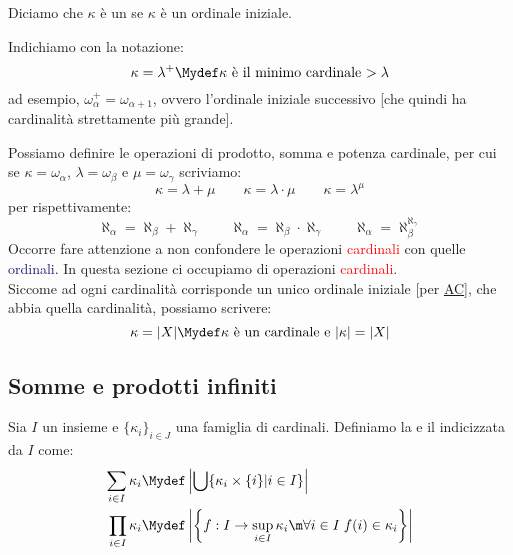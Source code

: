 \documentclass[11pt]{scrartcl}
\begin{document}
\begin{definition}[Cardinali]
	Diciamo che $\kappa$ è un  se $\kappa$ è un ordinale iniziale.
\end{definition}

\begin{notation}
	Indichiamo con la notazione:
	\[ \kappa = \lambda^+ \Mydef \text{$\kappa$ è il minimo cardinale $>\lambda$}
		\]
	ad esempio, $\omega_\alpha^+ = \omega_{\alpha + 1}$, ovvero l'ordinale iniziale successivo [che quindi ha cardinalità strettamente più grande].
\end{notation}

Possiamo definire le operazioni di prodotto, somma e potenza cardinale, per cui se $\kappa = \omega_\alpha$, $\lambda = \omega_\beta$ e $\mu = \omega_\gamma$ scriviamo:
\[ \kappa =  \lambda + \mu \qquad \kappa = \lambda \cdot \mu \qquad \kappa = \lambda^\mu
	\]
per rispettivamente:
\[ \aleph_\alpha = \aleph_\beta + \aleph_\gamma \qquad \aleph_\alpha = \aleph_\beta \cdot \aleph_\gamma \qquad \aleph_\alpha = \aleph_\beta^{\aleph_\gamma}
	\]
Occorre fare attenzione a non confondere le operazioni \textcolor{red}{cardinali} con quelle \textcolor{MidnightBlue}{ordinali}. In questa sezione ci occupiamo di operazioni \textcolor{red}{cardinali}.\\
Siccome ad ogni cardinalità corrisponde un unico ordinale iniziale [per \hyperref[ax9]{AC}], che abbia quella cardinalità, possiamo scrivere:
\[ \kappa = |X| \Mydef \text{$\kappa$ è un cardinale e $|\kappa| = |X|$}
	\]

\subsection{Somme e prodotti infiniti}

\begin{definition}
	Sia $I$ un insieme e $\{\kappa_i\}_{i \in J}$ una famiglia di cardinali. Definiamo la  e il  indicizzata da $I$ come:
	 \begin{align*}
		\sum_{i \in I} \kappa_i &\Mydef\left\lvert \bigcup\{\kappa_i \times \{i\} | i \in I\}\right\rvert \\
		\prod_{i \in I} \kappa_i &\Mydef \left\lvert \left\{f : I \rightarrow \sup_{i \in I} \kappa_i \m  \forall i \in I \; f(i) \in \kappa_i\right\}\right\rvert 
	 \end{align*}
\end{definition}
\end{document}
